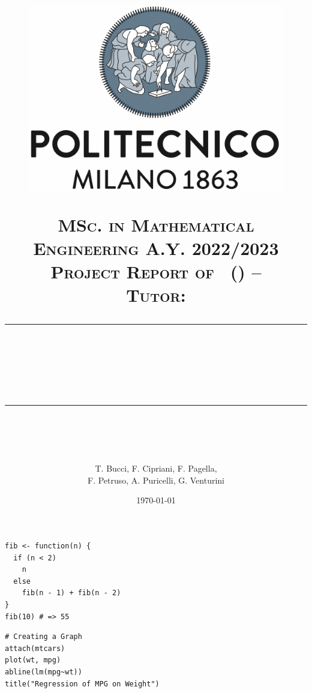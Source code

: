 \documentclass{article}
\title{
    \begin{figure}[htpb]
        \centering
        \includegraphics[scale=0.2]{images/logo-polimi}
    \end{figure}
    \normalfont \normalsize 
    \textsc{MSc. in Mathematical Engineering A.Y. 2022/2023\\ 
    Project Report of \coursename\ (\coursecode) -- \courseprof \\
    Tutor: \coursetutor} \\
    [10pt] 
    \rule{\linewidth}{0.5pt} \\ [6pt] 
    \huge \papertitle \\
    \rule{\linewidth}{2pt}  \\ [10pt]
}
\author{T. Bucci, F. Cipriani, F. Pagella,\\ F. Petruso, A. Puricelli, G. Venturini}
\date{\normalsize \today}
\begin{document}
\maketitle

\begin{abstract}
    \lipsum
\end{abstract}

\setlength{\columnsep}{0.8cm}
    


\begin{verbatim}
fib <- function(n) {
  if (n < 2)
    n
  else
    fib(n - 1) + fib(n - 2)
}
fib(10) # => 55
\end{verbatim}

\begin{verbatim}
# Creating a Graph
attach(mtcars)
plot(wt, mpg)
abline(lm(mpg~wt))
title("Regression of MPG on Weight")
\end{verbatim}

\nocite{*}
\printbibliography
\end{document}
